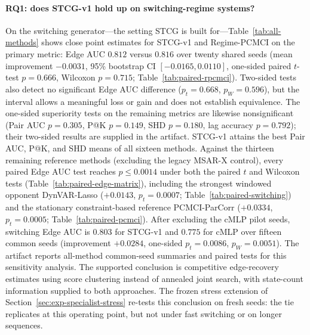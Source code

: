 \documentclass[sigconf,anonymous]{acmart}
\begin{document}
\paragraph{RQ1: does STCG-v1 hold up on switching-regime systems?}
On the switching generator---the setting STCG is built for---Table~\ref{tab:all-methods} shows close point estimates for STCG-v1 and Regime-PCMCI on the primary metric: Edge AUC $0.812$ versus $0.816$ over twenty shared seeds (mean improvement $-0.0031$, 95\% bootstrap CI $[-0.0165, 0.0110]$, one-sided paired $t$-test $p=0.666$, Wilcoxon $p=0.715$; Table~\ref{tab:paired-rpcmci}). Two-sided tests also detect no significant Edge AUC difference ($p_t=0.668$, $p_W=0.596$), but the interval allows a meaningful loss or gain and does not establish equivalence.
The one-sided superiority tests on the remaining metrics are likewise nonsignificant (Pair AUC $p=0.305$, P@K $p=0.149$, SHD $p=0.180$, lag accuracy $p=0.792$); their two-sided results are supplied in the artifact. STCG-v1 attains the best Pair AUC, P@K, and SHD means of all sixteen methods.
Against the thirteen remaining reference methods (excluding the legacy MSAR-X control), every paired Edge AUC test reaches $p \leq 0.0014$ under both the paired $t$ and Wilcoxon tests (Table~\ref{tab:paired-edge-matrix}), including the strongest windowed opponent DynVAR-Lasso ($+0.0143$, $p_t=0.0007$; Table~\ref{tab:paired-switching}) and the stationary constraint-based reference PCMCI-ParCorr ($+0.0334$, $p_t=0.0005$; Table~\ref{tab:paired-pcmci}).
After excluding the cMLP pilot seeds, switching Edge AUC is $0.803$ for STCG-v1 and $0.775$ for cMLP over fifteen common seeds (improvement $+0.0284$, one-sided $p_t=0.0086$, $p_W=0.0051$). The artifact reports all-method common-seed summaries and paired tests for this sensitivity analysis.
The supported conclusion is competitive edge-recovery estimates using score clustering instead of annealed joint search, with state-count information supplied to both approaches.
The frozen stress extension of Section~\ref{sec:exp-specialist-stress} re-tests this conclusion on fresh seeds: the tie replicates at this operating point, but not under fast switching or on longer sequences.

\begin{table}[t]
\caption{Paired STCG-v1 versus Regime-PCMCI tests on switching-regime recovery over twenty seeds. Positive improvement means STCG-v1 is better; for SHD it means fewer errors. $p_t$ and $p_W$ are one-sided superiority tests. None establishes superiority; these tests do not establish equivalence.}
\label{tab:paired-rpcmci}
\centering
\small
\resizebox{\linewidth}{!}{}
\end{table}
\end{document}
